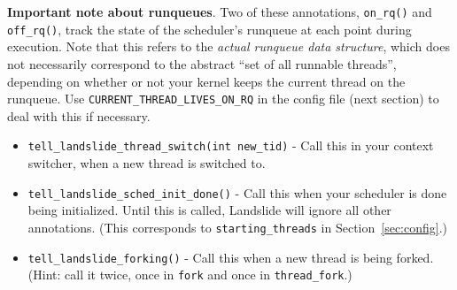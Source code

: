 \documentclass{article}
\begin{document}
{\bf Important note about runqueues}.
Two of these annotations, \texttt{on\_rq()} and \texttt{off\_rq()}, track the state of the scheduler's runqueue at each point during execution.
Note that this refers to the {\em actual runqueue data structure}, which does not necessarily correspond to the abstract ``set of all runnable threads'', depending on whether or not your kernel keeps the current thread on the runqueue. Use \texttt{CURRENT\_THREAD\_LIVES\_ON\_RQ} in the config file (next section) to deal with this if necessary.

\begin{itemize}
	\item \texttt{tell\_landslide\_thread\_switch(int new\_tid)} - Call this in your context switcher, when a new thread is switched to.
	\item \texttt{tell\_landslide\_sched\_init\_done()} - Call this when your scheduler is done being initialized. Until this is called, Landslide will ignore all other annotations. (This corresponds to \texttt{starting\_threads} in Section~\ref{sec:config}.)
	\item \texttt{tell\_landslide\_forking()} - Call this when a new thread is being forked.
		(Hint: call it twice, once in \texttt{fork} and once in \texttt{thread\_fork}.)


\end{itemize}
\end{document}
